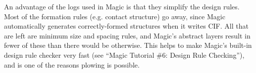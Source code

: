 \documentclass[letterpaper,twoside,12pt]{article}
\begin{document}
An advantage of the logs used in Magic is
that they simplify the design rules.  Most of the formation
rules (e.g. contact structure) go away, since Magic automatically
generates correctly-formed structures when it writes CIF.
All that are left are minimum size and spacing rules, and
Magic's abstract layers result in fewer of these than there
would be otherwise.  This helps to make Magic's built-in
design rule checker very fast (see ``Magic Tutorial  \#6:
Design Rule Checking''), and is one of the reasons
plowing is possible.
\end{document}
